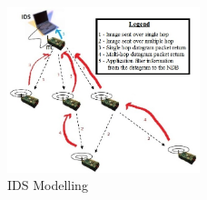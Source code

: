 \documentclass[conference,final]{IEEEtran}
\begin{document}
\begin{figure}[btp]
    \centering
    \includegraphics[width=0.5\textwidth]{IDS}
    \caption{IDS Modelling}
    \label{fig:ids_model}
\end{figure}
\end{document}
